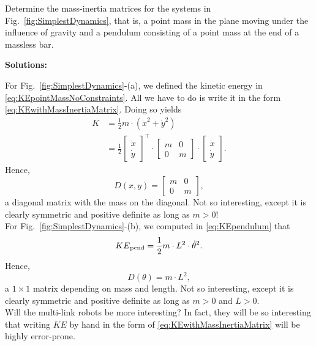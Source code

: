 \begin{example} Determine the mass-inertia matrices for the systems in Fig.~\ref{fig:SimplestDynamics}, that is, a point mass in the plane moving under the influence of gravity and a pendulum consisting of a point mass at the end of a massless bar.
\end{example}
\textbf{Solutions:}

For Fig.~\ref{fig:SimplestDynamics}-(a), we defined the kinetic energy in \eqref{eq:KEpointMassNoConstraints}. All we have to do is write it in the form \eqref{eq:KEwithMassInertiaMatrix}. Doing so yields
\begin{align*}
    K & = \frac{1}{2} m \cdot\left( \dot{x}^2  +  \dot{y}^2 \right) \\
    & = \frac{1}{2} \left[ \begin{array}{c} \dot{x} \\  \dot{y}\end{array} \right]^\top \cdot  
    \left[ \begin{array}{cc} 
    m &  0 \\  
    0 & m    
    \end{array} \right]
    \cdot \left[ \begin{array}{c} \dot{x} \\  \dot{y}\end{array} \right].
\end{align*} 
Hence, 
$$ D(x, y) = 
    \left[ \begin{array}{cc} 
    m &  0 \\  
    0 & m    
    \end{array} \right],$$
a diagonal matrix with the mass on the diagonal. Not so interesting, except it is clearly symmetric and positive definite as long as $m>0$!\\

For Fig.~\ref{fig:SimplestDynamics}-(b), we computed in \eqref{eq:KEpendulum} that 
$$ {KE}_{\rm pend} = \frac{1}{2} m \cdot L^2 \cdot \dot{\theta}^2.$$
Hence, 
$$D(\theta) = m \cdot L^2, $$
a $1 \times 1$ matrix depending on mass and length. Not so interesting, except it is clearly symmetric and positive definite as long as $m>0$ and $L >0$.\\

Will the multi-link robots be more interesting? In fact, they will be so interesting that writing $KE$ by hand in the form of \eqref{eq:KEwithMassInertiaMatrix} will be highly error-prone. 

\vspace{.2cm}


